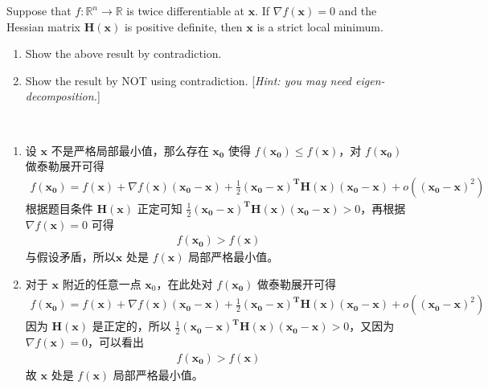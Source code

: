 \documentclass[11pt,letter,notitlepage]{article}
\begin{document}
\begin{exercise}
	Suppose that $f:\mathbb{R}^n\rightarrow\mathbb{R}$ is twice differentiable at $\mathbf{x}$. If $\nabla f(\mathbf{x})=0$ and the Hessian matrix $\mathbf{H}(\mathbf{x})$ is positive definite, then $\mathbf{x}$ is a strict local minimum.
	\begin{enumerate}
		\item Show the above result by contradiction.
		\item Show the result by NOT using contradiction. [\emph{Hint: you may need eigen-decomposition.}]
	\end{enumerate}
\end{exercise}

\begin{solution}
	\heiti
	\ \\
	\begin{enumerate}
		\item 设 $\mathbf{x}$ 不是严格局部最小值，那么存在 $\mathbf{x_0}$ 使得 $f(\mathbf{x_0}) \leq f(\mathbf{x})$，对 $f(\mathbf{x_0})$ 做泰勒展开可得
			\begin{align*}
				f(\mathbf{x_0}) = f(\mathbf{x}) + \nabla f(\mathbf{x})(\mathbf{x_0} - \mathbf{x}) + \frac{1}{2}(\mathbf{x_0} - \mathbf{x})^\mathbf{T}\mathbf{H}(\mathbf{x})(\mathbf{x_0} - \mathbf{x}) + o((\mathbf{x_0} - \mathbf{x})^2)
			\end{align*}
		根据题目条件 $\mathbf{H}(\mathbf{x})$ 正定可知 $\frac{1}{2}(\mathbf{x_0} - \mathbf{x})^\mathbf{T}\mathbf{H}(\mathbf{x})(\mathbf{x_0} - \mathbf{x}) > 0$，再根据$\nabla f(\mathbf{x})=0$ 可得
			\begin{align*}
				f(\mathbf{x_0}) > f(\mathbf{x})
			\end{align*}
		与假设矛盾，所以$\mathbf{x}$ 处是 $f(\mathbf{x})$ 局部严格最小值。
		\item 对于 $\mathbf{x}$ 附近的任意一点 $\mathbf{x}_0$，在此处对 $f(\mathbf{\mathbf{x}_0})$ 做泰勒展开可得
			\begin{align*}
				f(\mathbf{x_0}) = f(\mathbf{x}) + \nabla f(\mathbf{x})(\mathbf{x_0} - \mathbf{x}) + \frac{1}{2}(\mathbf{x_0} - \mathbf{x})^\mathbf{T}\mathbf{H}(\mathbf{x})(\mathbf{x_0} - \mathbf{x}) + o((\mathbf{x_0} - \mathbf{x})^2)
			\end{align*}
			因为 $\mathbf{H}(\mathbf{x})$ 是正定的，所以 $\frac{1}{2}(\mathbf{x_0} - \mathbf{x})^\mathbf{T}\mathbf{H}(\mathbf{x})(\mathbf{x_0} - \mathbf{x}) > 0$，又因为 $\nabla f(\mathbf{x})=0$，可以看出
				\begin{align*}
					f(\mathbf{x_0}) > f(\mathbf{x})
				\end{align*}
			故 $\mathbf{x}$ 处是 $f(\mathbf{x})$ 局部严格最小值。
	\end{enumerate}

\end{solution}
\newpage
\end{document}
